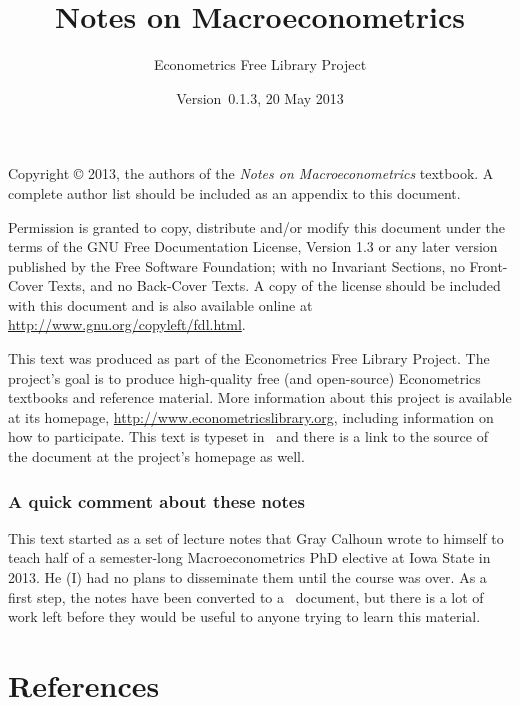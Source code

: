 \documentclass{tex/tufte-handout}
\title{Notes on Macroeconometrics}
\author{Econometrics Free Library Project}
\date{Version~0.1.3, 20 May 2013}
\begin{document}
\maketitle

\bigskip\noindent%
Copyright © 2013, the authors of the \textit{Notes on
  Macroeconometrics} textbook.  A complete author list should be
included as an appendix to this document.

Permission is granted to copy, distribute and/or modify this document
under the terms of the GNU Free Documentation License, Version 1.3 or
any later version published by the Free Software Foundation; with no
Invariant Sections, no Front-Cover Texts, and no Back-Cover Texts.  A
copy of the license should be included with this document and is also
available online at \url{http://www.gnu.org/copyleft/fdl.html}.

This text was produced as part of the Econometrics Free Library
Project.  The project's goal is to produce high-quality free (and
open-source) Econometrics textbooks and reference material.  More
information about this project is available at its homepage,
\url{http://www.econometricslibrary.org}, including information on how
to participate.  This text is typeset in \XeLaTeX\ and there is a link
to the source of the document at the project's homepage as well.

\tableofcontents

\section{A quick comment about these notes}
This text started as a set of lecture notes that Gray Calhoun wrote to
himself to teach half of a semester-long Macroeconometrics PhD
elective at Iowa State in 2013.  He (I) had no plans to disseminate
them until the course was over.  As a first step, the notes have been
converted to a \XeLaTeX\ document, but there is a lot of work left
before they would be useful to anyone trying to learn this material.






\appendix



\part*{References}

\end{document}

